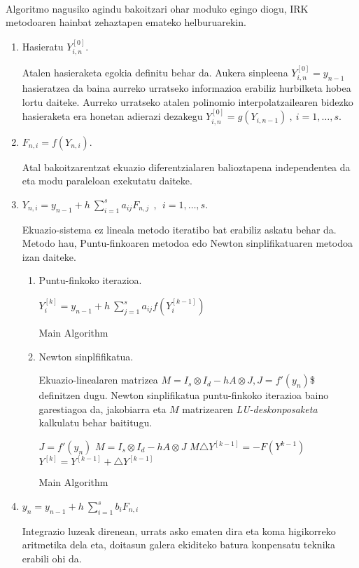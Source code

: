 \paragraph*{}Algoritmo nagusiko agindu bakoitzari ohar moduko egingo diogu, IRK metodoaren hainbat zehaztapen emateko helburuarekin.
\begin{enumerate}
\item Hasieratu  $Y_{i,n}^{[0]}$.

Atalen hasieraketa egokia definitu behar da. Aukera sinpleena $Y_{i,n}^{[0]}=y_{n-1}$ hasieratzea da baina aurreko urratseko informazioa erabiliz hurbilketa hobea lortu daiteke. Aurreko urratseko atalen polinomio interpolatzailearen bidezko hasieraketa era honetan adierazi dezakegu  $Y_{i,n}^{[0]}=g(Y_{i,n-1}) \ , \ i=1, \dots, s$.      

\item $F_{n,i}=f(Y_{n,i})$.

Atal bakoitzarentzat ekuazio diferentzialaren balioztapena independentea da eta modu paraleloan exekutatu daiteke.

\item   $Y_{n,i}=y_{n-1}+ h \ \sum\limits_{i=1}^{s} a_{ij} F_{n,j}  \ \ , \ \  i=1,\dots,s$.

Ekuazio-sistema ez lineala metodo iteratibo bat erabiliz askatu behar da. Metodo hau, Puntu-finkoaren metodoa edo Newton  sinplifikatuaren metodoa izan daiteke.  

\begin{enumerate}

\item Puntu-finkoko iterazioa.

\begin{algorithm}[H]
  {
   $Y_{i}^{[k]}=y_{n-1}+ h \ \sum\limits_{j=1}^{s} a_{ij} f(Y_i^{[k-1]}) $\; 
  }
 \caption{Main Algorithm}
\end{algorithm}


\item Newton sinplfifikatua.

Ekuazio-linealaren matrizea $M= I_s \otimes I_d -hA \otimes J, J=f'(y_n)$\$ definitzen dugu. Newton sinplifikatua puntu-finkoko iterazioa baino garestiagoa da, jakobiarra eta $M$ matrizearen \emph{LU-deskonposaketa} kalkulatu behar baititugu.  

\begin{algorithm}[H]
  $J=f'(y_n)$\;
  $M= I_s \otimes I_d -hA \otimes J$\;
  {
   $M\triangle Y^{[k-1]}=-F(Y^{k-1})$\;
   $Y^{[k]}=Y^{[k-1]}+\triangle Y^{[k-1]}$\; 
  }
 \caption{Main Algorithm}
\end{algorithm}


\end{enumerate}


\item $y_{n}=y_{n-1}+ h \ \sum\limits_{i=1}^{s} b_i F_{n,i} $\;

Integrazio luzeak direnean, urrats asko ematen dira eta koma higikorreko aritmetika dela eta, doitasun galera ekiditeko batura konpensatu teknika erabili ohi da.


\end{enumerate} 

